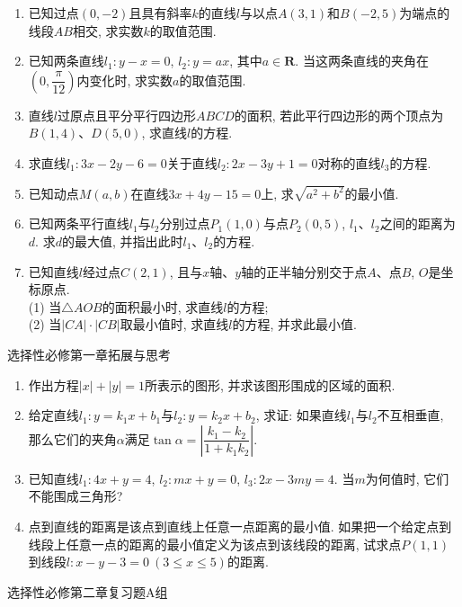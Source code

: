 \documentclass[10pt,a4paper]{article}
\begin{document}
\begin{enumerate}[1.]
\item 已知过点$(0, -2)$且具有斜率$k$的直线$l$与以点$A(3, 1)$和$B(-2, 5)$为端点的线段$AB$相交, 求实数$k$的取值范围.
\item 已知两条直线$l_1: y-x=0$, $l_2: y=ax$, 其中$a\in \mathbf{R}$. 当这两条直线的夹角在$(0, \dfrac{\pi}{12})$内变化时, 求实数$a$的取值范围.
\item 直线$l$过原点且平分平行四边形$ABCD$的面积, 若此平行四边形的两个顶点为$B(1, 4)$、$D(5, 0)$, 求直线$l$的方程.
\item 求直线$l_1: 3x-2y-6=0$关于直线$l_2: 2x-3y+1=0$对称的直线$l_3$的方程.
\item 已知动点$M(a, b)$在直线$3x+4y-15=0$上, 求$\sqrt{a^2+b^2}$的最小值.
\item 已知两条平行直线$l_1$与$l_2$分别过点$P_1(1, 0)$与点$P_2(0, 5)$, $l_1$、$l_2$之间的距离为$d$. 求$d$的最大值, 并指出此时$l_1$、$l_2$的方程.
\item 已知直线$l$经过点$C(2, 1)$, 且与$x$轴、$y$轴的正半轴分别交于点$A$、点$B$, $O$是坐标原点.\\
(1) 当$\triangle AOB$的面积最小时, 求直线$l$的方程;\\
(2) 当$|CA|\cdot |CB|$取最小值时, 求直线$l$的方程, 并求此最小值.
\end{enumerate}

选择性必修第一章拓展与思考

\begin{enumerate}[1.]
\item 作出方程$|x|+|y|=1$所表示的图形, 并求该图形围成的区域的面积.
\item 给定直线$l_1: y=k_1x+b_1$与$l_2: y=k_2x+b_2$, 求证: 如果直线$l_1$与$l_2$不互相垂直, 那么它们的夹角$\alpha$满足$\tan \alpha=|\dfrac{k_1-k_2}{1+k_1k_2}|$.
\item 已知直线$l_1: 4x+y=4$, $l_2: mx+y=0$, $l_3: 2x-3my=4$. 当$m$为何值时, 它们不能围成三角形?
\item 点到直线的距离是该点到直线上任意一点距离的最小值. 如果把一个给定点到线段上任意一点的距离的最小值定义为该点到该线段的距离, 试求点$P(1, 1)$到线段$l: x-
y-3=0 \ (3\le x\le 5)$的距离.   
\end{enumerate}

选择性必修第二章复习题A组
\end{document}
